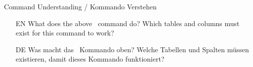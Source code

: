 %
\begin{question}{Command Understanding / Kommando Verstehen}%
%
%
\begin{itemize}%
\item[EN] What does the above \sqlDialect\ command do? %
Which tables and columns must exist for this command to work?%
\item[DE] Was macht das \sqlDialect\ Kommando oben? %
Welche Tabellen und Spalten müssen existieren, damit dieses Kommando funktioniert?%
\end{itemize}%
\end{question}%
%
%
\endhsection%
